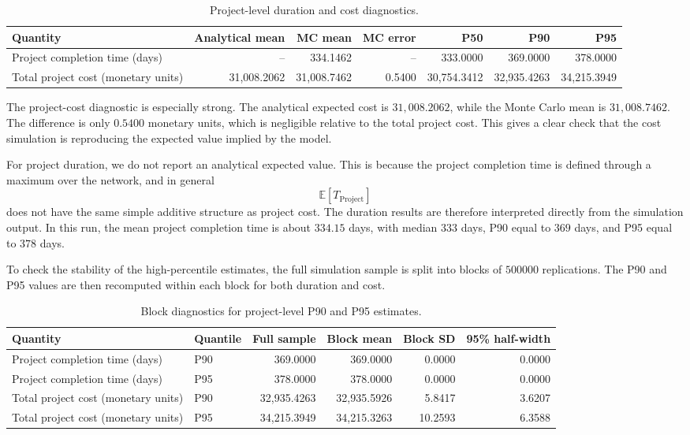 \documentclass[11pt,a4paper]{article}
\providecommand{\E}{\mathbb{E}}
\newcommand{\E}{\mathbb{E}}
\newcommand{\1}{\mathbf{1}}
\theoremstyle{definition}
\theoremstyle{plain}
\theoremstyle{remark}
\numberwithin{equation}{section}
\begin{document}
\begin{table}[H]
\centering
\small
\caption{Project-level duration and cost diagnostics.}
\label{tab:project-level-duration-cost-check}
\begin{adjustbox}{max width=\linewidth}
\begin{tabular}{lrrrrrr}
\toprule
Quantity & Analytical mean & MC mean & MC error & P50 & P90 & P95 \\
\midrule
Project completion time (days)
& -- & 334.1462 & -- & 333.0000 & 369.0000 & 378.0000 \\
Total project cost (monetary units)
& 31,008.2062 & 31,008.7462 & 0.5400 & 30,754.3412 & 32,935.4263 & 34,215.3949 \\
\bottomrule
\end{tabular}
\end{adjustbox}
\end{table}

The project-cost diagnostic is especially strong. The analytical expected cost is $31{,}008.2062$, while the Monte Carlo mean is $31{,}008.7462$. The difference is only $0.5400$ monetary units, which is negligible relative to the total project cost. This gives a clear check that the cost simulation is reproducing the expected value implied by the model.

For project duration, we do not report an analytical expected value. This is because the project completion time is defined through a maximum over the network, and in general
\[
\E[T_{\text{Project}}]
\]
does not have the same simple additive structure as project cost. The duration results are therefore interpreted directly from the simulation output. In this run, the mean project completion time is about $334.15$ days, with median $333$ days, P90 equal to $369$ days, and P95 equal to $378$ days.

To check the stability of the high-percentile estimates, the full simulation sample is split into blocks of $500000$ replications. The P90 and P95 values are then recomputed within each block for both duration and cost.

\begin{table}[H]
\centering
\small
\caption{Block diagnostics for project-level P90 and P95 estimates.}
\label{tab:project-level-p90-p95-block-uncertainty}
\begin{adjustbox}{max width=\linewidth}
\begin{tabular}{llrrrr}
\toprule
Quantity & Quantile & Full sample & Block mean & Block SD & 95\% half-width \\
\midrule
Project completion time (days) & P90 & 369.0000 & 369.0000 & 0.0000 & 0.0000 \\
Project completion time (days) & P95 & 378.0000 & 378.0000 & 0.0000 & 0.0000 \\
Total project cost (monetary units) & P90 & 32,935.4263 & 32,935.5926 & 5.8417 & 3.6207 \\
Total project cost (monetary units) & P95 & 34,215.3949 & 34,215.3263 & 10.2593 & 6.3588 \\
\bottomrule
\end{tabular}
\end{adjustbox}
\end{table}
\end{document}
